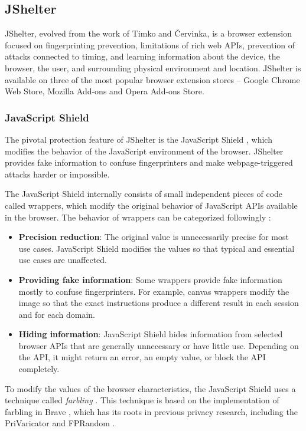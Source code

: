 \subsection{JShelter}

JShelter, evolved from the work of Timko \cite{MatejTimkoDP} and Červinka, is a browser extension focused on fingerprinting prevention, limitations of rich web APIs, prevention of attacks connected to timing, and learning information about the device, the browser, the user, and surrounding physical environment and location. JShelter is available on three of the most popular browser extension stores -- Google Chrome Web Store, Mozilla Add-ons and Opera Add-ons Store.

\subsubsection{JavaScript Shield}

The pivotal protection feature of JShelter is the JavaScript Shield \cite{JShelterJavaScriptShield}, which modifies the behavior of the JavaScript environment of the browser. JShelter provides fake information to confuse fingerprinters and make webpage-triggered attacks harder or impossible.

The JavaScript Shield internally consists of small independent pieces of code called wrappers, which modify the original behavior of JavaScript APIs available in the browser. The behavior of wrappers can be categorized followingly \cite{JShelterJavaScriptShield}:

\begin{itemize}
	\item \textbf{Precision reduction}: The original value is unnecessarily precise for most use cases. JavaScript Shield modifies the values so that typical and essential use cases are unaffected.
	\item \textbf{Providing fake information}: Some wrappers provide fake information mostly to confuse fingerprinters. For example, canvas wrappers modify the image so that the exact instructions produce a different result in each session and for each domain.
	\item \textbf{Hiding information}: JavaScript Shield hides information from selected browser APIs that are generally unnecessary or have little use. Depending on the API, it might return an error, an empty value, or block the API completely.
\end{itemize}

To modify the values of the browser characteristics, the JavaScript Shield uses a technique called \emph{farbling} \cite{JShelterPaper}. This technique is based on the implementation of farbling in Brave \cite{BraveFingerprintingDefences2}, which has its roots in previous privacy research, including the PriVaricator \cite{PriVaricator} and FPRandom \cite{FPRandom}.

